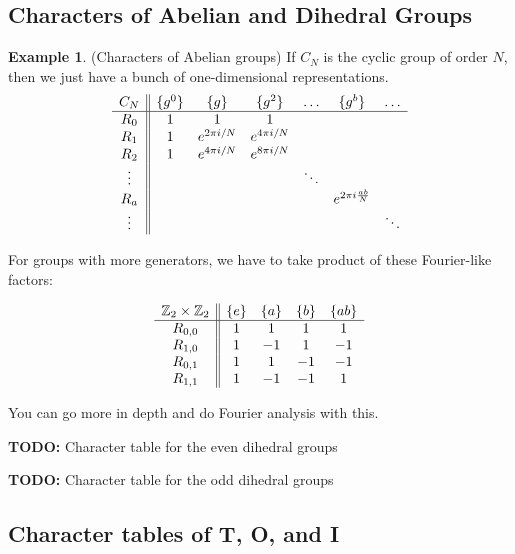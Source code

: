 \documentclass[12pt, letterpaper]{article}
\theoremstyle{definition} %
\newtheorem{ex}[thm]{Example}
\begin{document}
\subsection{Characters of Abelian and Dihedral Groups}

\begin{ex} (Characters of Abelian groups)
  If $C_N$ is the cyclic group of order $N$, then we just have a bunch of one-dimensional representations.
\begin{equation*}
 \begin{array}{c || c c c c c c} 
   C_N& \{g^0\} & \{g\} & \{g^2\} & \ldots & \{g^b\} & \ldots \\ 
 \hline
 R_0 & 1 & 1 & 1 & & & \\ 
 R_1 & 1 & e^{2\pi i/N}  & e^{4\pi i/N}  & & &\\
 R_2 & 1 & e^{4\pi i/N} & e^{8\pi i/N}& & &\\
 \vdots &  & & &\ddots & &\\
 R_a &  &  & & & e^{2\pi i\frac{ab}{N}} &\\
 \vdots &  & & & & & \ddots
\end{array}
\end{equation*}

For groups with more generators, we have to take product of these Fourier-like factors:

\begin{equation*}
 \begin{array}{c || c c c c } 
   \mathbb{Z}_2\times \mathbb{Z}_2& \{e\} & \{a\} & \{b\} & \{ab\} \\ 
 \hline
 R_{0,0} & 1 & 1 & 1 & 1  \\ 
 R_{1,0} & 1 & -1 & 1 & -1  \\ 
 R_{0,1} & 1 & 1 & -1 & -1  \\ 
 R_{1,1} & 1 & -1 & -1 & 1 
\end{array}
\end{equation*}

You can go more in depth and do Fourier analysis with this.
\end{ex}

{\color{red} \bf TODO:}
Character table for the even dihedral groups

{\color{red} \bf TODO:}
Character table for the odd dihedral groups

\subsection{Character tables of T, O, and I}
\end{document}
